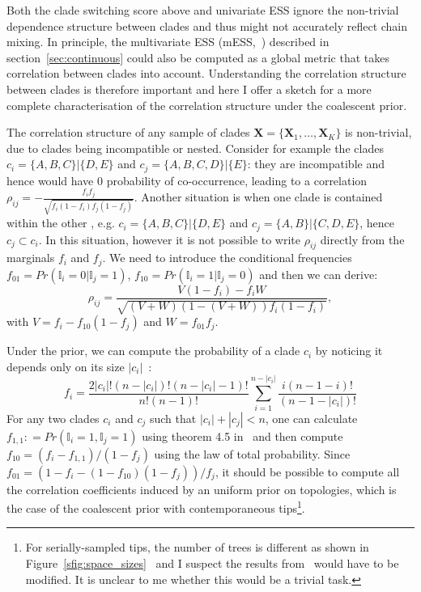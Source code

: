 Both the clade switching score above and univariate ESS ignore the non-trivial dependence structure between clades and thus might not accurately reflect chain mixing.
In principle, the multivariate ESS (mESS,~\cite{Vats2015}) described in section~\ref{sec:continuous} could also be computed as a global metric that takes correlation between clades into account.
Understanding the correlation structure between clades is therefore important and here I offer a sketch for a more complete characterisation of the correlation structure under the  coalescent prior.

The correlation structure of any sample of clades $\boldsymbol X = \{\boldsymbol X_1, \ldots, \boldsymbol X_K \}$ is non-trivial, due to clades being incompatible or nested.
Consider for example the clades $c_i = \{A, B, C\} | \{ D, E\}$ and $c_j = \{A, B, C, D\} | \{ E\}$: they are incompatible and hence would have $0$ probability of co-occurrence, leading to a correlation $ \rho_{ij} = -\frac{f_if_j}{\sqrt{f_i(1-f_i)f_j(1-f_j)}}$.
Another situation is when one clade is contained within the other , e.g. $c_i = \{A, B, C\} | \{ D, E\}$ and $c_j = \{A, B\} | \{C, D, E \}$, hence $c_j \subset c_i$.
In this situation, however it is not possible to write $\rho_{ij}$ directly from the marginals $f_i$ and $f_j$.
We need to introduce the conditional frequencies $f_{01} = Pr(\mathbb{I}_i = 0 | \mathbb{I}_j = 1)$, $f_{10} = Pr(\mathbb{I}_i = 1 | \mathbb{I}_j = 0)$ and then we can derive:
\begin{equation}
\rho_{ij} = \frac{V(1-f_i) - f_iW}{\sqrt{(V + W)(1- (V + W))f_i(1-f_i)}},  
\end{equation}
with $V = f_i -f_{10}(1-f_j)$ and $W = f_{01}f_j$.

Under the prior, we can compute the probability of a clade $c_i$ by noticing it depends only on its size $|c_i|$~\citep[Eq. 14]{Brown1994}:
\begin{equation}
\label{eq:clade_prob}
 f_i = \frac{2|c_i|!(n-|c_i|)!(n-|c_i|-1)!}{n!(n-1)!}\sum_{i=1}^{n-|c_i|}\frac{i(n-1-i)!}{(n-1-|c_i|)!}
\end{equation}
For any two clades $c_i$ and $c_j$ such that $|c_i| + |c_j| < n$, one can calculate $f_{1,1} : = Pr(\mathbb{I}_i = 1, \mathbb{I}_j = 1)$ using theorem 4.5 in~\cite{Zhu2011} and then compute  $f_{10} = (f_i - f_{1,1})/(1-f_j)$ using  the law of total probability.
Since $f_{01} =(1-f_i - (1-f_{10})(1-f_j))/f_j$, it should be possible to compute all the correlation coefficients induced by an uniform prior on topologies, which is the case of the coalescent prior with contemporaneous tips\footnote{For serially-sampled tips, the number of trees is different as shown in Figure~\ref{sfig:space_sizes}~\citep{Gavryushkina2013} and I suspect the results from~\cite{Brown1994} would have to be modified. It is unclear to me whether this would be a trivial task.}.

